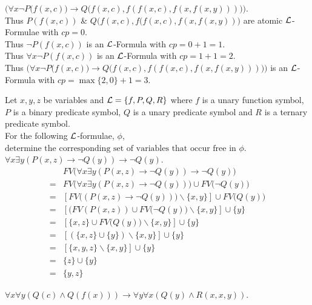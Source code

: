 \documentclass[11pt,a4paper]{article}
\begin{document}
\qpartnb $\big(\forall x\neg P\big(f(x,c)\big)\to Q\big(f(x,c),f(f(x,c),f(x,f(x,y)))\big)\big)$.\\

\apart
Thus $P(f(x,c))$ \& $Q\big(f(x,c),f(f(x,c),f(x,f(x,y))\big)$ are atomic $\mathcal{L}$-Formulae with $cp=0$.\\
Thus $\neg P(f(x,c))$ is an $\mathcal{L}$-Formula with $cp=0+1=1$.\\
Thus $\forall x\neg P(f(x,c))$ is an $\mathcal{L}$-Formula with $cp=1+1=2$.\\
Thus $\big(\forall x\neg P\big(f(x,c)\big)\to Q\big(f(x,c),f(f(x,c),f(x,f(x,y)))\big)\big)$ is an $\mathcal{L}$-Formula with ${cp=\max\{2,0\}+1=3}$.


{}
\question
Let $x,y,z$ be variables and $\mathcal{L}=\{f,P,Q,R\}$ where $f$ is a unary function symbol, $P$ is a binary predicate symbol, $Q$ is a unary predicate symbol and $R$ is a ternary predicate symbol.\\
For the following $\mathcal{L}$-formulae, $\phi$, $\text{determine the corresponding set of variables that occur free in }\phi$.\\

\qpartnb $\forall x\exists y (P(x,z)\to\neg Q(y))\to\neg Q(y)$.\\

\apartnb
\[\begin{array}{rl}
&FV\big(\forall x\exists y (P(x,z)\to\neg Q(y))\to\neg Q(y)\big)\\
=&FV\big(\forall x\exists y (P(x,z)\to\neg Q(y))\big)\cup FV\big(\neg Q(y)\big)\\
=&[FV\big((P(x,z)\to\neg Q(y))\big)\backslash\{x,y\}]\cup FV\big(Q(y)\big)\\
=&[\big(FV(P(x,z))\cup FV(\neg Q(y)\big)\backslash\{x,y\}]\cup\{y\}\\
=&[\{x,z\}\cup FV(Q(y)\big)\backslash\{x,y\}]\cup\{y\}\\
=&[(\{x,z\}\cup\{y\})\backslash\{x,y\}]\cup\{y\}\\
=&[\{x,y,z\}\backslash\{x,y\}]\cup\{y\}\\
=&\{z\}\cup\{y\}\\
=&\{y,z\}
\end{array}\]

\qpartnb $\forall x\forall y(Q(c)\wedge Q(f(x)))\to\forall y\forall x(Q(y)\wedge R(x,x,y))$.\\
\end{document}
